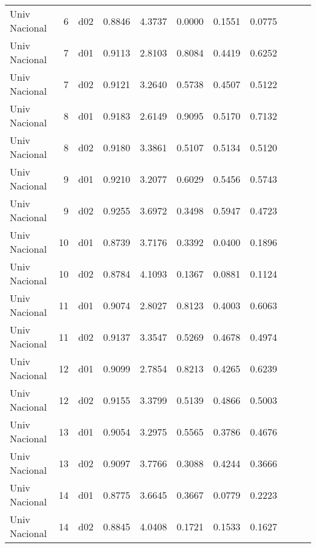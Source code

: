 \begin{landscape}
\begin{longtable}{p{2cm}rrrrrrrrrr}
           Univ Nacional  &          6 &     d02 &   0.8846 &  4.3737 &        0.0000 &           0.1551 &  0.0775 \\
           Univ Nacional  &          7 &     d01 &   0.9113 &  2.8103 &        0.8084 &           0.4419 &  0.6252 \\
           Univ Nacional  &          7 &     d02 &   0.9121 &  3.2640 &        0.5738 &           0.4507 &  0.5122 \\
           Univ Nacional  &          8 &     d01 &   0.9183 &  2.6149 &        0.9095 &           0.5170 &  0.7132 \\
           Univ Nacional  &          8 &     d02 &   0.9180 &  3.3861 &        0.5107 &           0.5134 &  0.5120 \\
           Univ Nacional  &          9 &     d01 &   0.9210 &  3.2077 &        0.6029 &           0.5456 &  0.5743 \\
           Univ Nacional  &          9 &     d02 &   0.9255 &  3.6972 &        0.3498 &           0.5947 &  0.4723 \\
           Univ Nacional  &         10 &     d01 &   0.8739 &  3.7176 &        0.3392 &           0.0400 &  0.1896 \\
           Univ Nacional  &         10 &     d02 &   0.8784 &  4.1093 &        0.1367 &           0.0881 &  0.1124 \\
           Univ Nacional  &         11 &     d01 &   0.9074 &  2.8027 &        0.8123 &           0.4003 &  0.6063 \\
           Univ Nacional  &         11 &     d02 &   0.9137 &  3.3547 &        0.5269 &           0.4678 &  0.4974 \\
           Univ Nacional  &         12 &     d01 &   0.9099 &  2.7854 &        0.8213 &           0.4265 &  0.6239 \\
           Univ Nacional  &         12 &     d02 &   0.9155 &  3.3799 &        0.5139 &           0.4866 &  0.5003 \\
           Univ Nacional  &         13 &     d01 &   0.9054 &  3.2975 &        0.5565 &           0.3786 &  0.4676 \\
           Univ Nacional  &         13 &     d02 &   0.9097 &  3.7766 &        0.3088 &           0.4244 &  0.3666 \\
           Univ Nacional  &         14 &     d01 &   0.8775 &  3.6645 &        0.3667 &           0.0779 &  0.2223 \\
           Univ Nacional  &         14 &     d02 &   0.8845 &  4.0408 &        0.1721 &           0.1533 &  0.1627 \\

\end{longtable}
\end{landscape}
